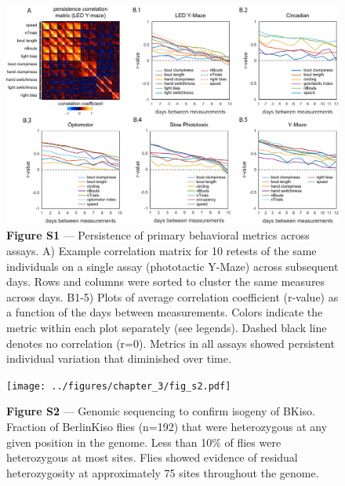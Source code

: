 \documentclass[12pt,letterpaper]{article}
\begin{document}
\begin{figure}[h!]
    \includegraphics[width=\textwidth]{../figures/chapter_3/fig_s1.pdf}
    \vspace{.05in}
    \caption*{\textbf{Figure S1} — Persistence of primary behavioral metrics across assays. A) Example correlation matrix for 10 retests of the same individuals on a single assay (phototactic Y-Maze) across subsequent days. Rows and columns were sorted to cluster the same measures across days. B1-5)  Plots of average correlation coefficient (r-value) as a function of the days between measurements. Colors indicate the metric within each plot separately (see legends). Dashed black line denotes no correlation (r=0). Metrics in all assays showed persistent individual variation that diminished over time.}
\end{figure}
\clearpage

\begin{figure}[t!]
    \texttt{[image: ../figures/chapter\_3/fig\_s2.pdf]}
    \caption*{\textbf{Figure S2} — Genomic sequencing to confirm isogeny of BKiso. Fraction of BerlinKiso flies (n=192) that were heterozygous at any given position in the genome. Less than 10\% of flies were heterozygous at most sites. Flies showed evidence of residual heterozygosity at approximately 75 sites throughout the genome.}
\end{figure}
\clearpage
\end{document}
